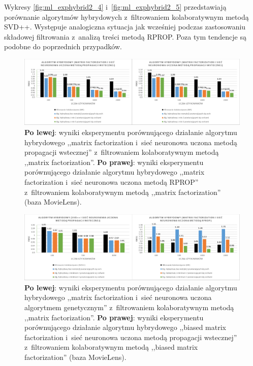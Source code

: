 \documentclass[twoside]{iisthesis}
\begin{document}
		Wykresy \ref{fig:ml_exphybrid2_4} i~\ref{fig:ml_exphybrid2_5} przedstawiają porównanie algorytmów hybrydowych z~filtrowaniem kolaboratywnym metodą SVD++. Występuje analogiczna sytuacja jak wcześniej podczas zastosowaniu składowej filtrowania z~analizą treści metodą RPROP. Poza tym tendencje są podobne do poprzednich przypadków.
		
		\begin{figure}
			\centering
			\includegraphics[width=1\textwidth]{ml_exphybrid2_1}			
			\caption{\textbf{Po lewej}: wyniki eksperymentu porównującego działanie algorytmu hybrydowego ,,matrix factorization i~sieć neuronowa uczona metodą propagacji wstecznej'' z~filtrowaniem kolaboratywnym metodą ,,matrix factorization''. \textbf{Po prawej}: wyniki eksperymentu porównującego działanie algorytmu hybrydowego ,,matrix factorization i~sieć neuronowa uczona metodą RPROP'' z~filtrowaniem kolaboratywnym metodą ,,matrix factorization'' (baza MovieLens).}
			\label{fig:ml_exphybrid2_1}
		\end{figure}
		
		\begin{figure}
			\centering
			\includegraphics[width=1\textwidth]{ml_exphybrid2_2}			
			\caption{\textbf{Po lewej}: wyniki eksperymentu porównującego działanie algorytmu hybrydowego ,,matrix factorization i~sieć neuronowa uczona algorytmem genetycznym'' z~filtrowaniem kolaboratywnym metodą ,,matrix factorization''. \textbf{Po prawej}: wyniki eksperymentu porównującego działanie algorytmu hybrydowego ,,biased matrix factorization i~sieć neuronowa uczona metodą propagacji wstecznej'' z~filtrowaniem kolaboratywnym metodą ,,biased matrix factorization'' (baza MovieLens).}
			\label{fig:ml_exphybrid2_2}
		\end{figure}
		
\end{document}
